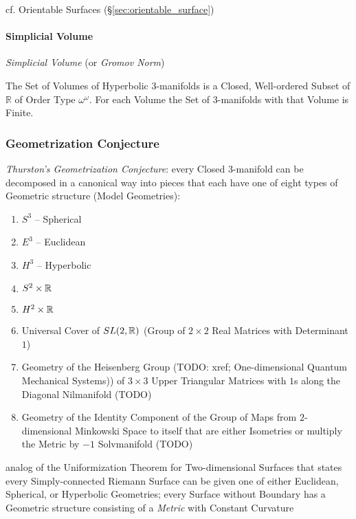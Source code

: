 cf. Orientable Surfaces (\S\ref{sec:orientable_surface})



\paragraph{Simplicial Volume}\label{sec:simplicial_volume}\hfill

\emph{Simplicial Volume} (or \emph{Gromov Norm})

The Set of Volumes of Hyperbolic 3-manifolds is a Closed, Well-ordered
Subset of $\mathbb{R}$ of Order Type $\omega^\omega$. For each Volume
the Set of 3-manifolds with that Volume is Finite.



\subsubsection{Geometrization Conjecture}
\label{sec:geometrization_conjecture}

\emph{Thurston's Geometrization Conjecture}: every Closed 3-manifold can be
decomposed in a canonical way into pieces that each have one of eight types of
Geometric structure (Model Geometries):
\begin{enumerate}
  \item $S^3$ -- Spherical
  \item $E^3$ -- Euclidean
  \item $H^3$ -- Hyperbolic
  \item $S^2 \times \mathbb{R}$
  \item $H^2 \times \mathbb{R}$
  \item Universal Cover of $SL(2, \mathbb{R})$ (Group of $2 \times 2$ Real Matrices
    with Determinant $1$)
  \item Geometry of the Heisenberg Group (TODO: xref;
    One-dimensional Quantum Mechanical Systems)) of $3 \times 3$ Upper
    Triangular Matrices with $1$s along the Diagonal
    \fist Nilmanifold (TODO)
  \item Geometry of the Identity Component of the Group of Maps from
    $2$-dimensional Minkowski Space to itself that are either Isometries or
    multiply the Metric by $-1$
    \fist Solvmanifold (TODO)
\end{enumerate}

analog of the Uniformization Theorem for Two-dimensional Surfaces that states
every Simply-connected Riemann Surface can be given one of either Euclidean,
Spherical, or Hyperbolic Geometries; every Surface without Boundary has a
Geometric structure consisting of a \emph{Metric} with Constant Curvature



